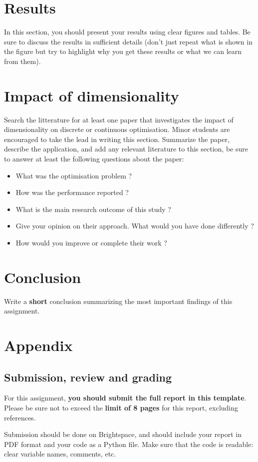 \documentclass[runningheads]{llncs}
\begin{document}
\section{Results}
In this section, you should present your results using clear figures and tables. Be sure to discuss the results in sufficient details (don't just repeat what is shown in the figure but try to highlight why you get these results or what we can learn from them).

\section{Impact of dimensionality}
Search the litterature for at least one paper that investigates the impact of dimensionality on discrete or continuous optimisation. Minor students are encouraged to take the lead in writing this section. Summarize the paper, describe the application, and add any relevant literature to this section, be
sure to answer at least the following questions about the paper:
\begin{itemize}
    \item What was the optimisation problem ?
    \item How was the performance reported ?
    \item What is the main research outcome of this study ?
    \item Give your opinion on their approach. What would you have done differently ?
    \item How would you improve or complete their work ?
\end{itemize}

\section{Conclusion}
Write a \textbf{short} conclusion summarizing the most important findings of this assignment.

\appendix
\section{Appendix}
\subsection{Submission, review and grading}\label{sec:submission}

For this assignment, \textbf{you should submit the full report in this template}. Please be sure not to exceed the \textbf{limit of 8 pages} for this report, excluding references.

Submission should be done on Brightspace, and should include your report in PDF format and your code as a Python file.  Make sure that the code is readable: clear variable names, comments, etc. 



\end{document}

